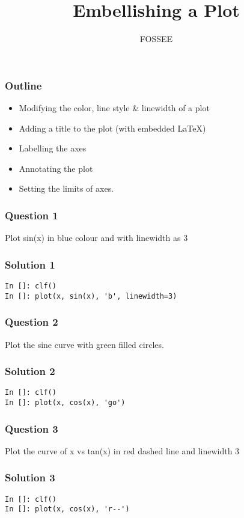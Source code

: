 \documentclass[presentation]{beamer}
\title{Embellishing a Plot}
\author{FOSSEE}
\date{}
\begin{document}
\maketitle









\begin{frame}
\frametitle{Outline}
\label{sec-1}

\begin{itemize}
\item Modifying the color, line style \& linewidth of a plot
\item Adding a title to the plot (with embedded \LaTeX{})
\item Labelling the axes
\item Annotating the plot
\item Setting the limits of axes.
\end{itemize}
\end{frame}
\begin{frame}
\frametitle{Question 1}
\label{sec-2}

  Plot sin(x) in blue colour and with linewidth as 3
\end{frame}
\begin{frame}[fragile]
\frametitle{Solution 1}
\label{sec-3}

\lstset{language=Python}
\begin{lstlisting}
In []: clf()
In []: plot(x, sin(x), 'b', linewidth=3)
\end{lstlisting}
\end{frame}
\begin{frame}
\frametitle{Question 2}
\label{sec-4}

  Plot the sine curve with green filled circles.
\end{frame}
\begin{frame}[fragile]
\frametitle{Solution 2}
\label{sec-5}

\lstset{language=Python}
\begin{lstlisting}
In []: clf()
In []: plot(x, cos(x), 'go')
\end{lstlisting}
\end{frame}
\begin{frame}
\frametitle{Question 3}
\label{sec-6}

  Plot the curve of x vs tan(x) in red dashed line and linewidth 3
\end{frame}
\begin{frame}[fragile]
\frametitle{Solution 3}
\label{sec-7}

\lstset{language=Python}
\begin{lstlisting}
In []: clf()
In []: plot(x, cos(x), 'r--')
\end{lstlisting}
\end{frame}
\end{document}

